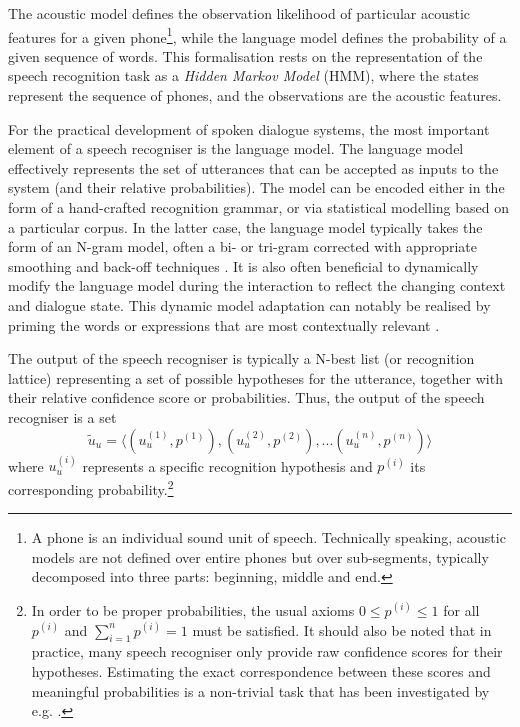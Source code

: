 The acoustic model defines the observation likelihood of particular acoustic features for a given phone\footnote{A phone is an individual sound unit of speech.  Technically speaking, acoustic models are not defined over entire phones but over sub-segments, typically decomposed into three parts: beginning, middle and end.}, while the language model defines the probability of a given sequence of words. This formalisation rests on the representation of the speech recognition task as a \textit{Hidden Markov Model} (HMM), where the states represent the sequence of phones, and the observations are the acoustic features.  


For the practical development of spoken dialogue systems, the most important element of a speech recogniser is the language model.  The language model effectively represents the set of utterances that can be accepted as inputs to the system (and their relative probabilities).  The model can be encoded either in the form of a hand-crafted recognition grammar, or via statistical modelling based on a particular corpus.  In the latter case, the language model typically takes the form of an N-gram model, often a bi- or tri-gram corrected with appropriate smoothing and back-off techniques  \citep{Jelinek:1998,ChenG99}.  It is also often beneficial to dynamically modify the language model during the interaction to reflect the changing context and dialogue state.  This dynamic model adaptation can notably be realised by priming the words or expressions that are most contextually relevant \citep{gruenstein2005context,ESSLLI2008-springerreprint}.

The output of the speech recogniser is typically a N-best list (or recognition lattice) representing a set of possible hypotheses for the utterance, together with their relative confidence score or probabilities.  Thus, the output of the speech recogniser is a set 
\begin{equation*}
\tilde{u}_u = \langle (u_u^{(1)}, p^{(1)}), (u_u^{(2)}, p^{(2)}), ... (u_u^{(n)}, p^{(n)})\rangle
\end{equation*}
where $u_u^{(i)}$ represents a specific recognition hypothesis and $p^{(i)}$ its corresponding probability.\footnote{In order to be proper probabilities,  the usual axioms $0 \leq p^{(i)} \leq 1$ for all $p^{(i)}$ and $\sum_{i=1}^n p^{(i)} = 1$ must be satisfied.   It should also be noted that in practice, many speech recogniser only provide raw confidence scores for their hypotheses.  Estimating the exact correspondence between these scores and meaningful probabilities is a non-trivial task that has been investigated by e.g. \cite{Williams08}.}

